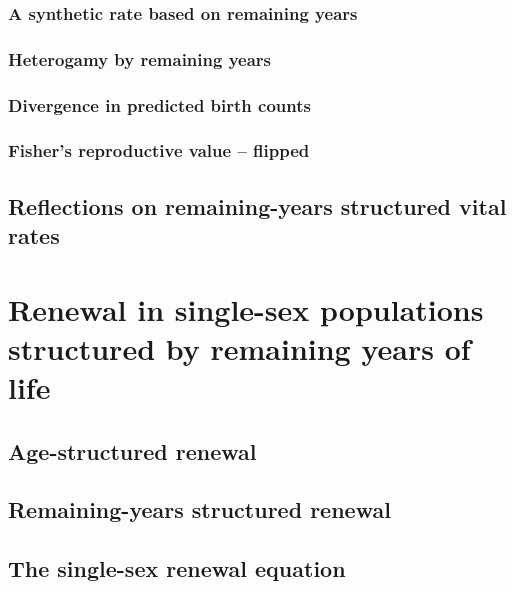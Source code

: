     \subsection{A synthetic rate based on remaining years}
      
    
    \subsection{Heterogamy by remaining years}
      
      
    \subsection{Divergence in predicted birth counts}
      
    \subsection{Fisher's reproductive value -- flipped}
      
  \section{Reflections on remaining-years structured vital rates}
      

  \chapter{Renewal in single-sex populations structured by remaining years of
life}
    
    \section{Age-structured renewal}
      
    \section{Remaining-years structured renewal}
      
    \section{The single-sex renewal equation}
      
